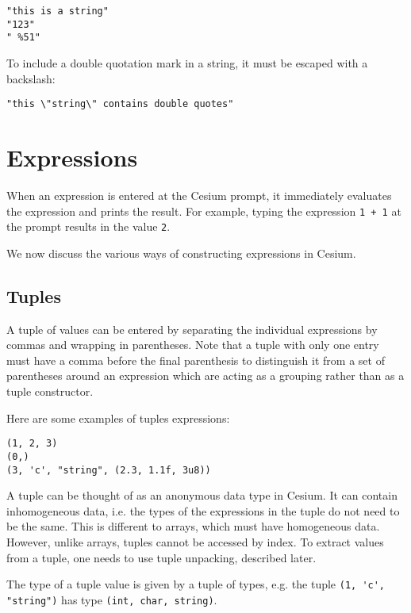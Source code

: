 \documentclass[a4paper,10pt]{article}
\newcommand{\code}{\lstinline}
\begin{document}
\begin{lstlisting}
"this is a string"
"123"
" %51"
\end{lstlisting}

To include a double quotation mark in a string, it must be escaped with a backslash:

\begin{lstlisting}
"this \"string\" contains double quotes"
\end{lstlisting}

\section{Expressions}

When an expression is entered at the Cesium prompt, it immediately evaluates the 
expression and prints the result. For example, typing the expression \code{1 + 1} at
the prompt results in the value \code{2}.

We now discuss the various ways of constructing expressions in Cesium.

\subsection{Tuples}

A tuple of values can be entered by separating the individual expressions by commas and
wrapping in parentheses. Note that a tuple with only one entry must have a comma before
the final parenthesis to distinguish it from a set of parentheses around an expression
which are acting as a grouping rather than as a tuple constructor.

Here are some examples of tuples expressions:

\begin{lstlisting}
(1, 2, 3)
(0,)
(3, 'c', "string", (2.3, 1.1f, 3u8))
\end{lstlisting}

A tuple can be thought of as an anonymous data type in Cesium. It can contain inhomogeneous
data, i.e. the types of the expressions in the tuple do not need to be the same. This is 
different to arrays, which must have homogeneous data. However, unlike arrays, tuples cannot 
be accessed by index. To extract values from a tuple, one needs to use tuple unpacking, described 
later.

The type of a tuple value is given by a tuple of types, e.g. the tuple \code{(1, 'c', "string")}
has type \code{(int, char, string)}.
\end{document}

